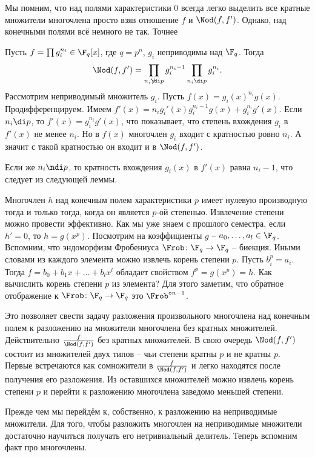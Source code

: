 Мы помним, что над полями характеристики 0 всегда легко выделить все  кратные множители многочлена просто взяв отношение $f$ и $\Nod(f,f')$. Однако, над конечными полями всё немного не так. Точнее

\lm Пусть $f= \prod g_i^{n_i}\in \F_q[x]$, где  $q=p^n$, $g_i$ неприводимы над $\F_q$. Тогда
$$\Nod(f,f')=\prod_{n_i \not\di p} g_i^{n_i-1} \prod_{n_i \di p}g_i^{n_i}.$$
\proof
Рассмотрим неприводимый множитель $g_i$. Пусть $f(x)=g_i(x)^{n_i}g(x)$. Продифференцируем. Имеем $f'(x)= n_ig_i'(x)g_i^{n_i-1}g(x)+ g_i^{n_i}g'(x)$. Если $n_i\di p$, то $f'(x)=g_i^{n_i}g'(x)$, что показывает, что степень вхождения $g_i$ в $f'(x)$ не менее $n_i$. Но в $f(x)$ многочлен $g_i$ входит с кратностью ровно $n_i$. А значит с такой кратностью он входит и в $\Nod(f,f')$.

Если же $n_i\ndi p$, то кратность вхождения $g_i(x)$ в $f'(x)$ равна $n_i-1$, что следует из следующей леммы.
\endproof
\elm

\lm Многочлен $h$ над конечным полем характеристики $p$ имеет нулевую производную тогда и только тогда, когда он является $p$-ой степенью. Извлечение степени можно провести эффективно.
\proof Как мы уже знаем с прошлого семестра, если $h'=0$, то $h=g(x^p)$. Посмотрим на коэффициенты $g$ -- $a_0, \dots, a_l\in \F_q$. Вспомним, что эндоморфизм Фробениуса $\Frob \colon \F_q \to  \F_q $ -- биекция. Иными словами из каждого элемента можно извлечь корень степени $p$. Пусть $b_i^p=a_i$. Тогда $f=b_0+b_1x+\dots+b_lx^l$ обладает свойством $f^p=g(x^p)=h$. Как вычислить корень степени $p$ из элемента? Для этого заметим, что обратное отображение к $\Frob \colon \F_q \to \F_q$ это $\Frob^{\circ n-1}$. 
\endproof
\elm 


Это позволяет свести задачу разложения произвольного многочлена над конечным полем к разложению на множители многочлена без кратных множителей. Действительно $\frac{f}{\Nod(f,f')}$ без кратных множителей. В свою очередь $\Nod(f,f')$ состоит из множителей двух типов -- чьи степени кратны $p$ и не кратны $p$. Первые встречаются как сомножители в  $\frac{f}{\Nod(f,f')}$ и легко находятся после получения его разложения. Из оставшихся множителей можно извлечь корень степени $p$ и перейти к разложению многочлена заведомо меньшей степени. 



Прежде чем мы перейдём к, собственно, к разложению на неприводимые множители. Для того, чтобы разложить многочлен на неприводимые множители достаточно научиться получать его нетривиальный делитель. Теперь вспомним факт про многочлены.

